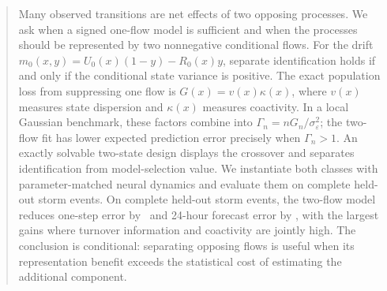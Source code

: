 \documentclass[twoside]{article}
\newcommand{\1}{\mathbf{1}}
\theoremstyle{plain}
\theoremstyle{definition}
\theoremstyle{remark}
\begin{document}


\begin{abstract}
Many observed transitions are net effects of two opposing processes. We ask when a signed one-flow model is sufficient and when the processes should be represented by two nonnegative conditional flows. For the drift $m_0(x,y)=U_0(x)(1-y)-R_0(x)y$, separate identification holds if and only if the conditional state variance is positive. The exact population loss from suppressing one flow is $G(x)=v(x)\kappa(x)$, where $v(x)$ measures state dispersion and $\kappa(x)$ measures coactivity. In a local Gaussian benchmark, these factors combine into $\Gamma_n=nG_n/\sigma_\varepsilon^2$; the two-flow fit has lower expected prediction error precisely when $\Gamma_n>1$. An exactly solvable two-state design displays the crossover and separates identification from model-selection value. We instantiate both classes with parameter-matched neural dynamics and evaluate them on complete held-out storm events. On complete held-out storm events, the two-flow model reduces one-step error by \MainStepGain\ and 24-hour forecast error by \MainForecastGain, with the largest gains where turnover information and coactivity are jointly high. The conclusion is conditional: separating opposing flows is useful when its representation benefit exceeds the statistical cost of estimating the additional component.
\end{abstract}










\clearpage


\clearpage
\appendix
\onecolumn
{}






\end{document}
